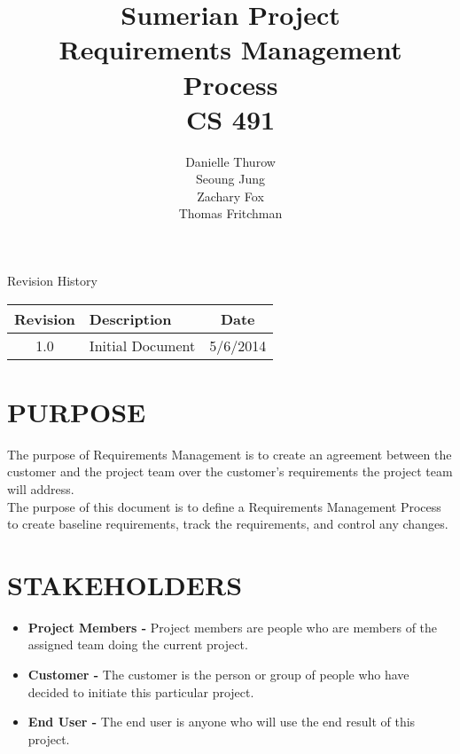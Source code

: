\documentclass[11pt]{article}
\title{Sumerian Project\\
Requirements Management Process\\
CS 491}
\author{Danielle Thurow \\
Seoung Jung\\
Zachary Fox\\
Thomas Fritchman}
\date{}
\begin{document}
\maketitle

\newpage

\tableofcontents

\newpage

\begin{center}

\Large Revision History\\
\begin{tabularx}{\textwidth}{|c|X|c|}
\hline
\textbf{Revision} & \textbf{Description} & \textbf{Date}\\ \hline
1.0 & Initial Document & 5/6/2014\\ \hline
\end{tabularx}


\end{center}

\newpage



\section{PURPOSE}
The purpose of Requirements Management is to create an agreement between the customer and the project team over the customer's requirements the project team will address.\\
 
The purpose of this document is to define a Requirements Management Process to create baseline requirements, track the requirements, and control any changes.\\

\section{STAKEHOLDERS}

\begin{itemize}

\item \textbf{Project Members -} Project members are people who are members of the assigned team doing the current project. \\

\item \textbf{Customer -} The customer is the person or group of people who have decided to initiate this particular project.\\

\item \textbf{End User -} The end user is anyone who will use the end result of this project.\\

\end{itemize}
\end{document}
